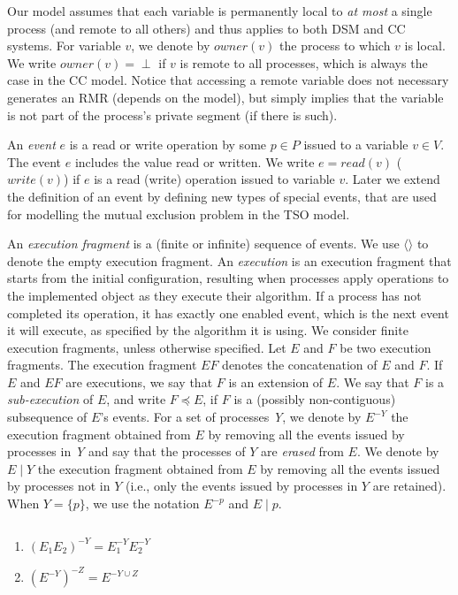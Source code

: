Our model assumes that each variable is permanently local to \emph{at most} a single process (and remote to all others) and thus applies to both DSM and CC systems.
For variable $v$, we denote by $owner(v)$ the process to which $v$ is local. We write $owner(v) = \perp$ if $v$ is remote to all processes, which is always the case in the CC model.
Notice that accessing a remote variable does not necessary generates an RMR (depends on the model), but simply implies that the variable is not part of the process's private segment (if there is such).


An \emph{event} $e$ is a read or write operation by some $p \in P$ issued to a variable $v \in V$.
The event $e$ includes the value read or written. We write $e = read(v)$ ($write(v)$) if $e$ is a read (write)
operation issued to variable $v$. Later we extend the definition of an event by defining
new types of special events, that are used for modelling the mutual exclusion problem in the TSO model.

An \emph{execution fragment} is a (finite or infinite) sequence of events. We use $\langle \rangle$ to denote the empty execution fragment. An \emph{execution} is an execution fragment that starts from the initial configuration, resulting when processes apply operations to the implemented object as they execute their algorithm. If a process has not completed its operation, it has exactly one enabled event, which is the next event it will execute, as specified by the algorithm it is using. We consider finite execution fragments, unless otherwise specified.
Let $E$ and $F$ be two execution fragments. The execution fragment $E F$ denotes the concatenation of $E$ and $F$. If $E$ and $E F$ are executions, we say that $F$ is an extension of $E$.
We say that $F$ is a \emph{sub-execution} of $E$, and write $F \preceq E$, if $F$ is a (possibly non-contiguous)
subsequence of $E$'s events. For a set of processes \emph{Y}, we denote by $E^{-Y}$
the execution fragment obtained from $E$ by removing all the events issued by processes in \emph{Y}
and say that the processes of $Y$ are \emph{erased} from $E$. We denote by $E \mid Y$ the execution fragment obtained from $E$ by removing all the events issued by processes not in $Y$ (i.e., only the events issued by processes in $Y$ are retained). When $Y = \{p\}$, we use the notation $E^{-p}$ and $E \mid p$.

\begin{fact}
	$ $
	\begin{enumerate}
		\item $(E_1 E_2)^{-Y} = E_1^{-Y} E_2^{-Y}$
		\item $(E^{-Y})^{-Z} = E^{-Y \cup Z}$
	\end{enumerate}
\end{fact}


